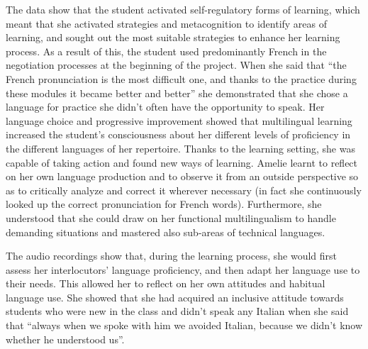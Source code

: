 \documentclass[output=paper]{../langscibook}
\begin{document}
The data show that the student activated self-regulatory forms of learning, which meant that she activated strategies and metacognition to identify areas of learning, and sought out the most suitable strategies to enhance her learning process. As a result of this, the student used predominantly French in the negotiation processes at the beginning of the project. When she said that “the French pronunciation is the most difficult one, and thanks to the practice during these modules it became better and better” she demonstrated that she chose a language for practice she didn’t often have the opportunity to speak. Her language choice and progressive improvement showed that multilingual learning increased the student’s consciousness about her different levels of proficiency in the different languages of her repertoire. Thanks to the learning setting, she was capable of taking action and found new ways of learning. Amelie learnt to reflect on her own language production and to observe it from an outside perspective so as to critically analyze and correct it wherever necessary (in fact she continuously looked up the correct pronunciation for French words). Furthermore, she understood that she could draw on her functional multilingualism to handle demanding situations and mastered also sub-areas of technical languages.  

The audio recordings show that, during the learning process, she would first assess her interlocutors’ language proficiency, and then adapt her language use to their needs. This allowed her to reflect on her own attitudes and habitual language use. She showed that she had acquired an inclusive attitude towards students who were new in the class and didn’t speak any Italian when she said that “always when we spoke with him we avoided Italian, because we didn’t know whether he understood us”. 
\end{document}
